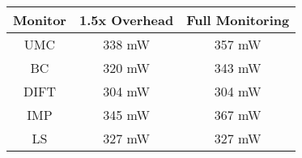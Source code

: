 

\begin{tabular}{|c|c|c|}
\hline

{\bf Monitor} & {\bf 1.5x Overhead} & {\bf Full Monitoring} \\ \hline\hline

UMC  & 338 mW & 357 mW \\ \hline
BC   & 320 mW & 343 mW \\ \hline
DIFT & 304 mW & 304 mW \\ \hline
IMP  & 345 mW & 367 mW \\ \hline
LS   & 327 mW & 327 mW \\ \hline

\end{tabular}
